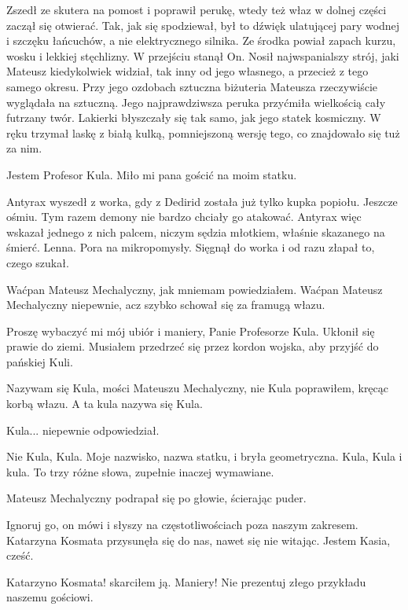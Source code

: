 Zszedł ze skutera na pomost i poprawił perukę, wtedy też właz w dolnej części zaczął się otwierać.
Tak, jak się spodziewał, był to dźwięk ulatującej pary wodnej i szczęku łańcuchów, a nie elektrycznego silnika.
Ze środka powiał zapach kurzu, wosku i lekkiej stęchlizny.
W przejściu stanął On.
Nosił najwspanialszy strój, jaki Mateusz kiedykolwiek widział, tak inny od jego własnego, a przecież z tego samego okresu.
Przy jego ozdobach sztuczna biżuteria Mateusza rzeczywiście wyglądała na sztuczną.
Jego najprawdziwsza peruka przyćmiła wielkością cały futrzany twór.
Lakierki błyszczały się tak samo, jak jego statek kosmiczny.
W ręku trzymał laskę z białą kulką, pomniejszoną wersję tego, co znajdowało się tuż za nim.

\ds{} Jestem Profesor Kula. Miło mi pana gościć na moim statku. \de{}

\divider{}

Antyrax wyszedł z worka, gdy z Dedirid została już tylko kupka popiołu.
Jeszcze ośmiu.
Tym razem demony nie bardzo chciały go atakować.
Antyrax więc wskazał jednego z nich palcem, niczym sędzia młotkiem, właśnie skazanego na śmierć.
Lenna. Pora na mikropomysły.
Sięgnął do worka i od razu złapał to, czego szukał.

\divider{}

\ds{} Waćpan Mateusz Mechalyczny, jak mniemam \dm{} powiedziałem. \dm{} Waćpan Mateusz Mechalyczny niepewnie, acz szybko schował się za framugą włazu. \de{}

\ds{} Proszę wybaczyć mi mój ubiór i maniery, Panie Profesorze Kula. \dm{} Ukłonił się prawie do ziemi. \dm{} 
Musiałem przedrzeć się przez kordon wojska, aby przyjść do pańskiej Kuli. \de{}

\ds{} Nazywam się Kula, mości Mateuszu Mechalyczny, nie Kula \dm{} poprawiłem, kręcąc korbą włazu. \dm{} A ta kula nazywa się Kula. \de{}

\ds{} Kula... \dm{} niepewnie odpowiedział. \de{}

\ds{} Nie Kula, Kula. Moje nazwisko, nazwa statku, i bryła geometryczna. Kula, Kula i kula. To trzy różne słowa, zupełnie inaczej wymawiane. \de{}

Mateusz Mechalyczny podrapał się po głowie, ścierając puder.

\ds{} Ignoruj go, on mówi i słyszy na częstotliwościach poza naszym zakresem. \dm{} Katarzyna Kosmata przysunęła się do nas, nawet się nie witając.
\dm{} Jestem Kasia, cześć. \de{}

\ds{} Katarzyno Kosmata! \dm{} skarciłem ją. \dm{} Maniery! Nie prezentuj złego przykładu naszemu gościowi.\de{}

